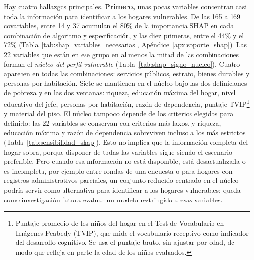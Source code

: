 \documentclass[12pt, letterpaper]{article}
\begin{document}
Hay cuatro hallazgos principales. \textbf{Primero,} unas pocas variables
concentran casi toda la información para identificar a los hogares
vulnerables. De las 165 a 169 covariables, entre 14 y 37 acumulan el 80\%
de la importancia SHAP en cada combinación de algoritmo y especificación,
y las diez primeras, entre el 44\% y el 72\%
(Tabla~\ref{tab:shap_variables_necesarias}, Apéndice~\ref{apx:soporte_shap}).
Las 22 variables que están en ese grupo en al menos la mitad de las
combinaciones forman el \emph{núcleo del perfil vulnerable}
(Tabla~\ref{tab:shap_signo_nucleo}). Cuatro aparecen en todas las
combinaciones: servicios públicos, estrato, bienes durables y personas por
habitación. Siete se mantienen en el núcleo bajo las dos definiciones de
pobreza y en las dos ventanas: riqueza, educación máxima del hogar, nivel
educativo del jefe, personas por habitación, razón de dependencia, puntaje
TVIP\footnote{Puntaje promedio de los niños del hogar en el Test de
Vocabulario en Imágenes Peabody (TVIP), que mide el vocabulario receptivo
como indicador del desarrollo cognitivo. Se usa el puntaje bruto, sin
ajustar por edad, de modo que refleja en parte la edad de los niños
evaluados.} y material del piso. El núcleo tampoco depende de los
criterios elegidos para definirlo: las 22 variables se conservan con
criterios más laxos, y riqueza, educación máxima y razón de dependencia
sobreviven incluso a los más estrictos
(Tabla~\ref{tab:sensibilidad_shap}). Esto no implica que la información
completa del hogar sobra, porque disponer de todas las variables
sigue siendo el escenario preferible. Pero cuando esa información no está
disponible, está desactualizada o es incompleta, por ejemplo entre rondas
de una encuesta o para hogares con registros administrativos parciales,
un conjunto reducido centrado en el núcleo podría servir como alternativa
para identificar a los hogares vulnerables; queda como investigación futura
evaluar un modelo restringido a esas variables.
\end{document}
